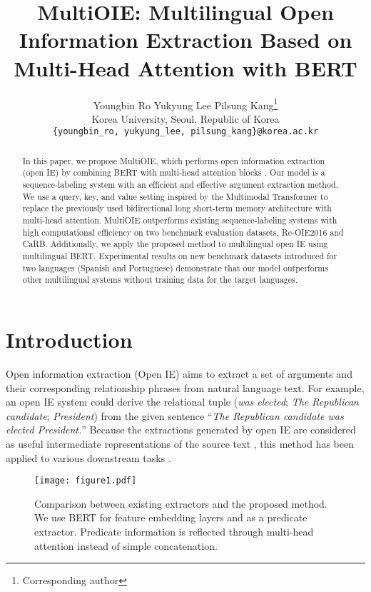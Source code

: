 \documentclass[11pt,a4paper]{article}
\title{MultiOIE: Multilingual Open Information Extraction Based on Multi-Head Attention with BERT}
\author
{
  Youngbin Ro \quad Yukyung Lee \quad Pilsung Kang\thanks{\; Corresponding author} \\
  Korea University, Seoul, Republic of Korea \\
  \texttt{\{youngbin\_ro, yukyung\_lee, pilsung\_kang\}@korea.ac.kr}
}
\begin{document}
\maketitle
\begin{abstract}
In this paper, we propose MultiOIE, which performs open information extraction (open IE) by combining BERT \citep{devlin-etal-2019-bert} with multi-head attention blocks \citep{10.5555/3295222.3295349}.
Our model is a sequence-labeling system with an efficient and effective argument extraction method.
We use a query, key, and value setting inspired by the Multimodal Transformer \citep{tsai-etal-2019-multimodal} to replace the previously used bidirectional long short-term memory architecture with multi-head attention.
MultiOIE outperforms existing sequence-labeling systems with high computational efficiency on two benchmark evaluation datasets, Re-OIE2016 and CaRB.
Additionally, we apply the proposed method to multilingual open IE using multilingual BERT.
Experimental results on new benchmark datasets introduced for two languages (Spanish and Portuguese) demonstrate that our model outperforms other multilingual systems without training data for the target languages.
\end{abstract}

\section{Introduction}
Open information extraction (Open IE) \citep{10.5555/1625275.1625705} aims to extract a set of arguments and their corresponding relationship phrases from natural language text.
For example, an open IE system could derive the relational tuple (\emph{was elected}; \emph{The Republican candidate}; \emph{President}) from the given sentence ``\emph{The Republican candidate was elected President.}''
Because the extractions generated by open IE are considered as useful intermediate representations of the source text \citep{10.5555/3061053.3061220}, this method has been applied to various downstream tasks \citep{christensen-etal-2013-towards,ding-etal-2016-knowledge,khot-etal-2017-answering,10.1145/3269206.3271707}.

\begin{figure}[t]
\texttt{[image: figure1.pdf]}
\caption
{
Comparison between existing extractors and the proposed method.
We use BERT for feature embedding layers and as a predicate extractor.
Predicate information is reflected through multi-head attention instead of simple concatenation.
}
\label{fig:1}
\centering
\end{figure}
\end{document}

